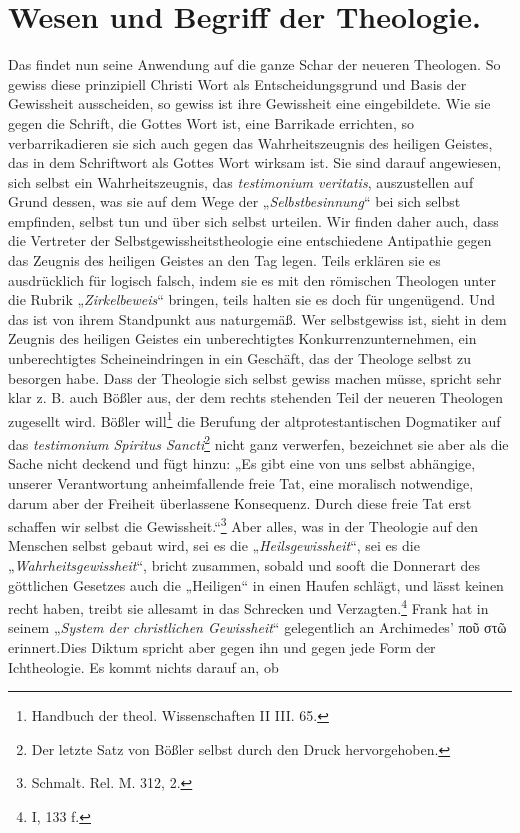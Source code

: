 \setcounter{footnote}{463}
\section*{Wesen und Begriff der Theologie.}

Das findet nun seine Anwendung auf die ganze Schar der neueren Theologen. So gewiss diese prinzipiell Christi Wort als Entscheidungsgrund und Basis der Gewissheit ausscheiden, so gewiss ist ihre Gewissheit eine eingebildete. Wie sie gegen die Schrift, die Gottes Wort ist, eine Barrikade errichten, so verbarrikadieren sie sich auch gegen das Wahrheitszeugnis des heiligen Geistes, das in dem Schriftwort als Gottes Wort wirksam ist. Sie sind darauf angewiesen, sich selbst ein Wahrheitszeugnis, das \textit{testimonium veritatis}, auszustellen auf Grund dessen, was sie auf dem Wege der „\emph{Selbstbesinnung}“ bei sich selbst empfinden, selbst tun und über sich selbst urteilen. Wir finden daher auch, dass die Vertreter der Selbstgewissheitstheologie eine entschiedene Antipathie gegen das Zeugnis des heiligen Geistes an den Tag legen. Teils erklären sie es ausdrücklich für logisch falsch, indem sie es mit den römischen Theologen unter die Rubrik „\emph{Zirkelbeweis}“ bringen, teils halten sie es doch für ungenügend. Und das ist von ihrem Standpunkt aus naturgemäß. Wer selbstgewiss ist, sieht in dem Zeugnis des heiligen Geistes ein unberechtigtes Konkurrenzunternehmen, ein unberechtigtes Scheineindringen in ein Geschäft, das der Theologe selbst zu besorgen habe. Dass der Theologie sich selbst gewiss machen müsse, spricht sehr klar z. B. auch Bößler aus, der dem rechts stehenden Teil der neueren Theologen zugesellt wird. Bößler will\footnote{Handbuch der theol. Wissenschaften II III. 65.} die Berufung der altprotestantischen Dogmatiker auf das \textit{testimonium Spiritus Sancti}\footnote{Der letzte Satz von Bößler selbst durch den Druck hervorgehoben.} nicht ganz verwerfen, bezeichnet sie aber als die Sache nicht deckend und fügt hinzu: „Es gibt eine von uns selbst abhängige, unserer Verantwortung anheimfallende freie Tat, eine moralisch notwendige, darum aber der Freiheit überlassene Konsequenz. Durch diese freie Tat erst schaffen wir selbst die Gewissheit.“\footnote{Schmalt. Rel. M. 312, 2.} Aber alles, was in der Theologie auf den Menschen selbst gebaut wird, sei es die „\emph{Heilsgewissheit}“, sei es die „\emph{Wahrheitsgewissheit}“, bricht zusammen, sobald und sooft die Donnerart des göttlichen Gesetzes auch die „Heiligen“ in einen Haufen schlägt, und lässt keinen recht haben, treibt sie allesamt in das Schrecken und Verzagten.\footnote{I, 133 f.} Frank hat in seinem „\emph{System der christlichen Gewissheit}“ gelegentlich an Archimedes’ \textgreek{ποῦ στῶ} erinnert.\footnotemark[468] Dies Diktum spricht aber gegen ihn und gegen jede Form der Ichtheologie. Es kommt nichts darauf an, ob